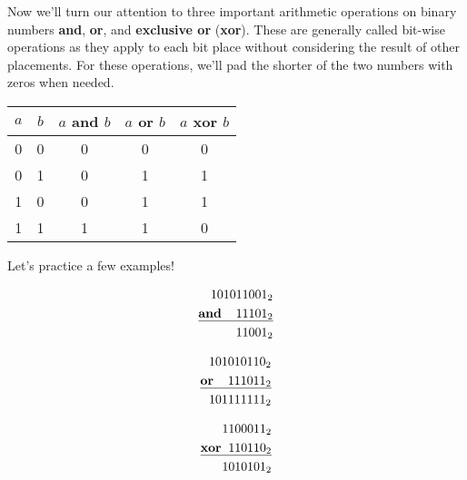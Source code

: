 Now we’ll turn our attention to three important arithmetic operations on binary numbers
\textbf{and}, \textbf{or}, and \textbf{exclusive or} (\textbf{xor}). These are generally
called bit-wise operations as they apply to each bit place without considering the result
of other placements. For these operations, we’ll pad the shorter of the two numbers with
zeros when needed.

\begin{center}
\begin{tabular}{|c|c|c|c|c|}
\hline
$a$ & $b$ & $a$ \textbf{and} $b$ & $a$ \textbf{or} $b$ & $a$ \textbf{xor} $b$ \\
\hline
0   &  0  &  0  &  0  &  0  \\ 
0   &  1  &  0  &  1  &  1  \\
1   &  0  &  0  &  1  &  1  \\
1   &  1  &  1  &  1  &  0  \\
\hline
\end{tabular}
\end{center}

Let’s practice a few examples!

\noindent%
\begin{minipage}{0.33333\linewidth}
\begin{align*}
101011001_2 &\\
\underline{\textbf{and}\hspace{4mm}11101_2}&\\
11001_2&\\
\end{align*}
\end{minipage}%
\begin{minipage}{0.33333\linewidth}
\begin{align*}
101010110_2 &\\
\underline{\textbf{or}\hspace{4mm}111011_2}&\\
101111111_2 &\\
\end{align*}
\end{minipage}%
\begin{minipage}{0.33333\linewidth}
\begin{align*}
1100011_2 &\\
\underline{\textbf{xor}\hspace{2mm}110110_2}&\\
1010101_2 &\\
\end{align*}
\end{minipage}

